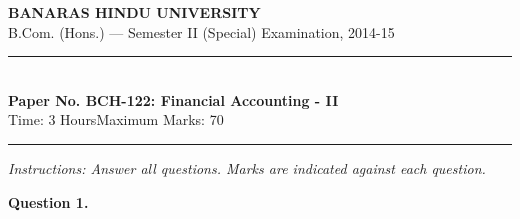 \documentclass[11pt,a4paper]{article}
\begin{document}
\begin{center}
  {\large\bfseries BANARAS HINDU UNIVERSITY}\\[2pt]
  {\normalsize B.Com. (Hons.) --- Semester II (Special) Examination, 2014-15}\\[6pt]
  \rule{0.8\linewidth}{0.5pt}\\[6pt]
  {\large\bfseries Paper No. BCH-122: Financial Accounting - II}\\[4pt]
  {\normalsize Time: 3 Hours\hfill Maximum Marks: 70}
\end{center}

\rule{\linewidth}{0.4pt}

\smallskip



\noindent   \textit{Instructions: Answer all questions. Marks are indicated against each question.}

\bigskip




\noindent   \textbf{Question 1.}
\end{document}
